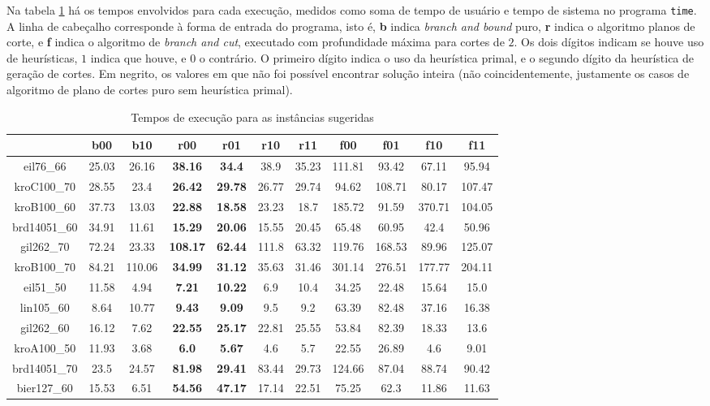 \documentclass[11pt]{article}
\begin{document}
Na tabela \ref{tab:tempos} há os tempos envolvidos para cada execução,
medidos como soma de tempo de usuário e tempo de sistema no programa
\texttt{time}. A linha de cabeçalho corresponde à forma de entrada do
programa, isto é, \textbf{b} indica \emph{branch and bound} puro,
\textbf{r} indica o algoritmo planos de corte, e \textbf{f} indica o
algoritmo de \emph{branch and cut}, executado com profundidade máxima
para cortes de $2$. Os dois dígitos indicam se houve uso
de heurísticas, $1$ indica que houve, e $0$ o contrário. O primeiro
dígito indica o uso da heurística primal,  e o segundo dígito da
heurística de geração de cortes. Em negrito, os valores em que não foi
possível encontrar solução inteira (não coincidentemente, justamente os
casos de algoritmo de plano de cortes puro sem heurística primal).



\begin{table}[htb]
\begin{tiny}
\centering
\begin{tabular}[b]{|c|c|c|c|c|c|c|c|c|c|c|}
\hline
& b00 & b10 & r00 & r01 & r10 & r11 & f00 & f01 & f10 & f11 \\ \hline
eil76\_66 & 25.03 & 26.16 & \textbf{38.16} & \textbf{34.4} & 38.9 & 35.23 & 111.81 & 93.42 & 67.11 & 95.94 \\ \hline
kroC100\_70 & 28.55 & 23.4 & \textbf{26.42} & \textbf{29.78} & 26.77 & 29.74 & 94.62 & 108.71 & 80.17 & 107.47 \\ \hline
kroB100\_60 & 37.73 & 13.03 & \textbf{22.88} & \textbf{18.58} & 23.23 & 18.7 & 185.72 & 91.59 & 370.71 & 104.05 \\ \hline
brd14051\_60 & 34.91 & 11.61 & \textbf{15.29} & \textbf{20.06} & 15.55 & 20.45 & 65.48 & 60.95 & 42.4 & 50.96 \\ \hline
gil262\_70 & 72.24 & 23.33 & \textbf{108.17} & \textbf{62.44} & 111.8 & 63.32 & 119.76 & 168.53 & 89.96 & 125.07 \\ \hline
kroB100\_70 & 84.21 & 110.06 & \textbf{34.99} & \textbf{31.12} & 35.63 & 31.46 & 301.14 & 276.51 & 177.77 & 204.11 \\ \hline
eil51\_50 & 11.58 & 4.94 & \textbf{7.21} & \textbf{10.22} & 6.9 & 10.4 & 34.25 & 22.48 & 15.64 & 15.0 \\ \hline
lin105\_60 & 8.64 & 10.77 & \textbf{9.43} & \textbf{9.09} & 9.5 & 9.2 & 63.39 & 82.48 & 37.16 & 16.38 \\ \hline
gil262\_60 & 16.12 & 7.62 & \textbf{22.55} & \textbf{25.17} & 22.81 & 25.55 & 53.84 & 82.39 & 18.33 & 13.6 \\ \hline
kroA100\_50 & 11.93 & 3.68 & \textbf{6.0} & \textbf{5.67} & 4.6 & 5.7 & 22.55 & 26.89 & 4.6 & 9.01 \\ \hline
brd14051\_70 & 23.5 & 24.57 & \textbf{81.98} & \textbf{29.41} & 83.44 & 29.73 & 124.66 & 87.04 & 88.74 & 90.42 \\ \hline
bier127\_60 & 15.53 & 6.51 & \textbf{54.56} & \textbf{47.17} & 17.14 & 22.51 & 75.25 & 62.3 & 11.86 & 11.63 \\ \hline
\end{tabular}
\end{tiny}
\caption{Tempos de execução para as instâncias sugeridas}
\label{tab:tempos}
\end{table}
\end{document}
